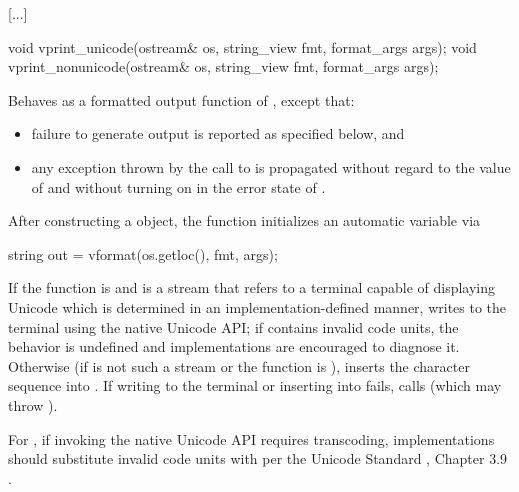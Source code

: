 \documentclass{wg21}
\begin{document}
\textcolor{noteclr}{[...]}


%
%
\begin{itemdecl}
    void vprint_unicode(ostream& os, string_view fmt, format_args args);
    void vprint_nonunicode(ostream& os, string_view fmt, format_args args);
\end{itemdecl}

\begin{itemdescr}
    \pnum
    \effects
    Behaves as a formatted output function
    of , except that:
    \begin{itemize}
        \item
        failure to generate output is reported as specified below, and
        \item
        any exception thrown by the call to  is propagated
        without regard to the value of  and
        without turning on  in the error state of .
    \end{itemize}
    After constructing a  object,
    the function initializes an automatic variable via
    \begin{codeblock}
        string out = vformat(os.getloc(), fmt, args);
    \end{codeblock}
    If the function is  and
     is a stream that refers to a terminal capable of displaying Unicode
    which is determined in an implementation-defined manner,
    writes  to the terminal using the native Unicode API;
    if  contains invalid code units,
    the behavior is undefined and
    implementations are encouraged to diagnose it.
    Otherwise (if  is not such a stream or
    the function is ),
    inserts the character sequence
     into .
    If writing to the terminal or inserting into  fails,
    calls 
    (which may throw ).

    \pnum
    \recommended
    For ,
    if invoking the native Unicode API requires transcoding,
    implementations should substitute invalid code units
    with  per
    the Unicode Standard , Chapter 3.9 .
\end{itemdescr}
\end{document}
